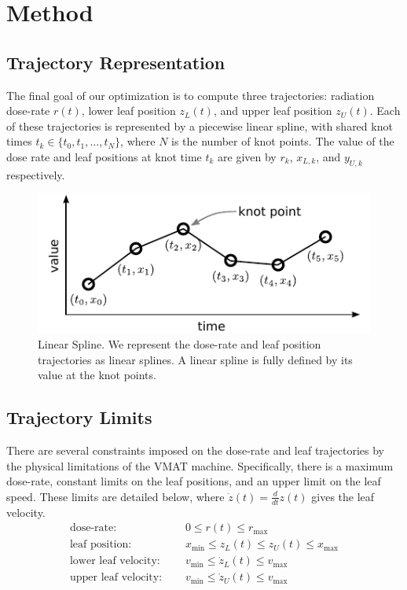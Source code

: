 \section{Method}


\subsection{Trajectory Representation}

The final goal of our optimization is to compute three trajectories:
radiation dose-rate $r(t)$, lower leaf position $z_L(t)$, and upper leaf position $z_U(t)$.
Each of these trajectories is represented by a piecewise linear spline,
with shared knot times $t_k \in \{t_0, t_1, \dots, t_N\}$, where $N$ is the number of knot points.
The value of the dose rate and leaf positions at knot time $t_k$ are given by
$r_k$, $x_{L,k}$, and $y_{U,k}$ respectively.

\begin{figure}
  \centering
  \includegraphics{fig/linearSpline.pdf}
  \caption{Linear Spline. We represent the dose-rate and leaf position trajectories as linear
           splines. A linear spline is fully defined by its value at the knot points. }
  \label{fig:linearSpline}
\end{figure}

\subsection{Trajectory Limits}

There are several constraints imposed on the dose-rate and leaf trajectories
by the physical limitations of the VMAT machine. Specifically, there is a maximum dose-rate,
constant limits on the leaf positions, and an upper limit on the leaf speed.
These limits are detailed below, where $\dot{z}(t) = \tfrac{d}{dt}z(t)$ gives the leaf velocity.
\begin{align}
  \text{dose-rate: }& \quad 0 \leq r(t) \leq r_\text{max}
      \label{eqn:FirstTrajectoryConstraint}\\
  \text{leaf position: }& \quad x_\text{min} \leq z_L(t) \leq z_U(t) \leq x_\text{max} \\
  \text{lower leaf velocity: }& \quad v_\text{min} \leq \dot{z}_L(t) \leq v_\text{max} \\
  \text{upper leaf velocity: }& \quad v_\text{min} \leq \dot{z}_U(t) \leq v_\text{max}
      \label{eqn:LastTrajectoryConstraint}
\end{align}

